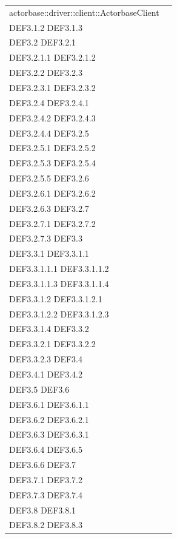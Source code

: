 \documentclass{scalatekids-article}
\begin{document}
\begin{longtable}[H]{|p{12cm}|p{5.5cm}|}
actorbase::driver::client::ActorbaseClient & \multiLineCell[t]{DEF3.1 DEF3.1.1\\DEF3.1.2 DEF3.1.3\\DEF3.2 DEF3.2.1\\DEF3.2.1.1 DEF3.2.1.2\\DEF3.2.2 DEF3.2.3\\DEF3.2.3.1 DEF3.2.3.2\\DEF3.2.4 DEF3.2.4.1\\DEF3.2.4.2 DEF3.2.4.3\\DEF3.2.4.4 DEF3.2.5\\DEF3.2.5.1 DEF3.2.5.2\\DEF3.2.5.3 DEF3.2.5.4\\DEF3.2.5.5 DEF3.2.6\\DEF3.2.6.1 DEF3.2.6.2\\DEF3.2.6.3 DEF3.2.7\\DEF3.2.7.1 DEF3.2.7.2\\DEF3.2.7.3 DEF3.3\\DEF3.3.1 DEF3.3.1.1\\DEF3.3.1.1.1 DEF3.3.1.1.2\\DEF3.3.1.1.3 DEF3.3.1.1.4\\DEF3.3.1.2 DEF3.3.1.2.1\\DEF3.3.1.2.2 DEF3.3.1.2.3\\DEF3.3.1.4 DEF3.3.2\\DEF3.3.2.1 DEF3.3.2.2\\DEF3.3.2.3 DEF3.4\\DEF3.4.1 DEF3.4.2\\DEF3.5 DEF3.6\\DEF3.6.1 DEF3.6.1.1\\DEF3.6.2 DEF3.6.2.1\\DEF3.6.3 DEF3.6.3.1\\DEF3.6.4 DEF3.6.5\\DEF3.6.6 DEF3.7\\DEF3.7.1 DEF3.7.2\\DEF3.7.3 DEF3.7.4\\DEF3.8 DEF3.8.1\\DEF3.8.2 DEF3.8.3}\\
\hline

\end{longtable}
\end{document}
